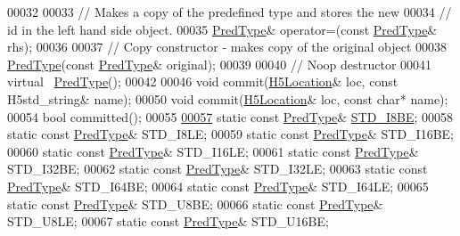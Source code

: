 \begin{DoxyCode}
00032 
00033         \textcolor{comment}{// Makes a copy of the predefined type and stores the new}
00034         \textcolor{comment}{// id in the left hand side object.}
00035         \hyperlink{class_h5_1_1_pred_type}{PredType}& operator=(\textcolor{keyword}{const} \hyperlink{class_h5_1_1_pred_type}{PredType}& rhs);
00036 
00037         \textcolor{comment}{// Copy constructor - makes copy of the original object}
00038         \hyperlink{class_h5_1_1_pred_type}{PredType}(\textcolor{keyword}{const} \hyperlink{class_h5_1_1_pred_type}{PredType}& original);
00039 
00040         \textcolor{comment}{// Noop destructor}
00041         \textcolor{keyword}{virtual} ~\hyperlink{class_h5_1_1_pred_type}{PredType}();
00042 
00046         \textcolor{keywordtype}{void} commit(\hyperlink{class_h5_1_1_h5_location}{H5Location}& loc, \textcolor{keyword}{const} H5std\_string& name);
00050         \textcolor{keywordtype}{void} commit(\hyperlink{class_h5_1_1_h5_location}{H5Location}& loc, \textcolor{keyword}{const} \textcolor{keywordtype}{char}* name);
00054         \textcolor{keywordtype}{bool} committed();
00055 
\hyperlink{class_h5_1_1_pred_type_a4d243f5aaf494acced895d2f1d5ffad7}{00057}         \textcolor{keyword}{static} \textcolor{keyword}{const} \hyperlink{class_h5_1_1_pred_type}{PredType}& \hyperlink{class_h5_1_1_pred_type_a4d243f5aaf494acced895d2f1d5ffad7}{STD\_I8BE};
00058         \textcolor{keyword}{static} \textcolor{keyword}{const} \hyperlink{class_h5_1_1_pred_type}{PredType}& STD\_I8LE;
00059         \textcolor{keyword}{static} \textcolor{keyword}{const} \hyperlink{class_h5_1_1_pred_type}{PredType}& STD\_I16BE;
00060         \textcolor{keyword}{static} \textcolor{keyword}{const} \hyperlink{class_h5_1_1_pred_type}{PredType}& STD\_I16LE;
00061         \textcolor{keyword}{static} \textcolor{keyword}{const} \hyperlink{class_h5_1_1_pred_type}{PredType}& STD\_I32BE;
00062         \textcolor{keyword}{static} \textcolor{keyword}{const} \hyperlink{class_h5_1_1_pred_type}{PredType}& STD\_I32LE;
00063         \textcolor{keyword}{static} \textcolor{keyword}{const} \hyperlink{class_h5_1_1_pred_type}{PredType}& STD\_I64BE;
00064         \textcolor{keyword}{static} \textcolor{keyword}{const} \hyperlink{class_h5_1_1_pred_type}{PredType}& STD\_I64LE;
00065         \textcolor{keyword}{static} \textcolor{keyword}{const} \hyperlink{class_h5_1_1_pred_type}{PredType}& STD\_U8BE;
00066         \textcolor{keyword}{static} \textcolor{keyword}{const} \hyperlink{class_h5_1_1_pred_type}{PredType}& STD\_U8LE;
00067         \textcolor{keyword}{static} \textcolor{keyword}{const} \hyperlink{class_h5_1_1_pred_type}{PredType}& STD\_U16BE;

\end{DoxyCode}
